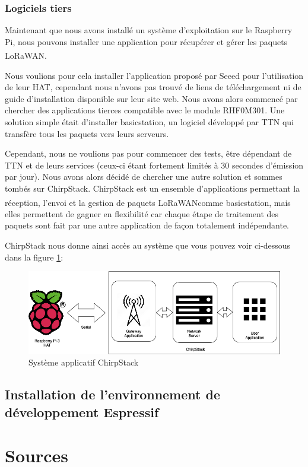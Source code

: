 \documentclass{article}
\begin{document}
			\subsubsection{Logiciels tiers}
				Maintenant que nous avons installé un système d'exploitation sur le Raspberry Pi, nous pouvons installer une application pour récupérer et gérer les paquets LoRaWAN\textsuperscript\textregistered.
				
				Nous voulions pour cela installer l'application proposé par Seeed pour l'utilisation de leur HAT, cependant nous n'avons pas trouvé de liens de téléchargement ni de guide d'installation disponible sur leur site web. 
				Nous avons alors commencé par chercher des applications tierces compatible avec le module RHF0M301. Une solution simple était d'installer basicstation, un logiciel développé par TTN qui transfère tous les paquets vers leurs serveurs.
				
				Cependant, nous ne voulions pas pour commencer des tests, être dépendant de TTN et de leurs services (ceux-ci étant fortement limités à 30 secondes d'émission par jour).
				Nous avons alors décidé de chercher une autre solution et sommes tombés sur ChirpStack. ChirpStack est un ensemble d'applications permettant la réception, l'envoi et la gestion de paquets LoRaWAN\textsuperscript\textregistered comme basicstation, mais elles permettent de gagner en flexibilité car chaque étape de traitement des paquets sont fait par une autre application de façon totalement indépendante.
				
				ChirpStack nous donne ainsi accès au système que vous pouvez voir ci-dessous dans la figure \ref{fig:systemechirpstack}:
				\begin{figure}[H]
					\centering
					\includegraphics[width=0.7\linewidth]{Systeme_ChirpStack}
					\caption{Système applicatif ChirpStack}
					\label{fig:systemechirpstack}
				\end{figure}
				
				
				
			\subsection{Installation de l'environnement de développement Espressif}
			
	\newpage
	\section{Sources}
		\printbibliography
\end{document}
